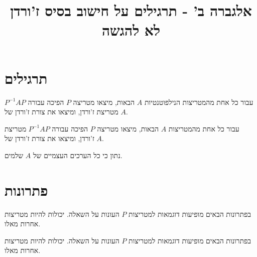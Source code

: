 \documentclass[a4paper,10pt,twoside,openany]{article}
\title{
אלגברה ב' - תרגילים על חישוב בסיס ז'ורדן \\
\vspace{1cm}
\large{לא להגשה}
}
\date{}
\begin{document}
\maketitle

\section*{תרגילים}

\begin{exercise}
עבור כל אחת מהמטריצות הנילפוטנטיות
$A$
הבאות, מיצאו מטריצה
$P$
הפיכה עבורה
$P^{-1} A P$
מטריצת ז'ורדן, ומיצאו את צורת ז'ורדן של
$A$.


\end{exercise}

\begin{exercise}
עבור כל אחת מהמטריצות
$A$
הבאות, מיצאו מטריצה
$P$
הפיכה עבורה
$P^{-1} A P$
מטריצת ז'ורדן, ומיצאו את צורת ז'ורדן של
$A$.

נתון כי כל הערכים העצמיים של
$A$
שלמים.


\end{exercise}

\section*{פתרונות}

\begin{solution}
בפתרונות הבאים מופיעות דוגמאות למטריצות
$P$
העונות על השאלה. יכולות להיות מטריצות אחרות מאלו.


\end{solution}

\begin{solution}
בפתרונות הבאים מופיעות דוגמאות למטריצות
$P$
העונות על השאלה. יכולות להיות מטריצות אחרות מאלו.


\end{solution}
\end{document}
